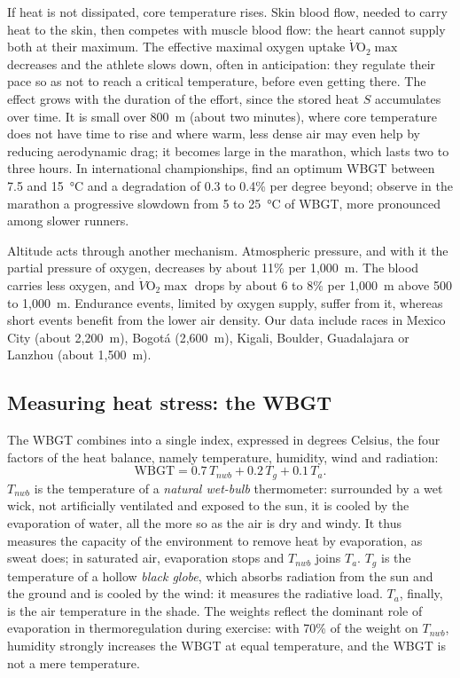 \documentclass[11pt,a4paper]{article}
\newcommand{\WBGT}{\mathrm{WBGT}}
\begin{document}
If heat is not dissipated, core temperature rises. Skin blood flow, needed to carry heat to the skin, then competes
with muscle blood flow: the heart cannot supply both at their maximum. The effective maximal oxygen uptake
$\dot V\mathrm{O}_2\max$ decreases and the athlete slows down, often in anticipation: they regulate their pace so as
not to reach a critical temperature, before even getting there. The effect grows with the duration of the effort,
since the stored heat $S$ accumulates over time. It is small over 800~m (about two minutes), where core temperature
does not have time to rise and where warm, less dense air may even help by reducing aerodynamic drag; it becomes
large in the marathon, which lasts two to three hours. In international championships, \citet{mantzios2022} find an
optimum WBGT between 7.5 and 15~°C and a degradation of 0.3 to 0.4\% per degree beyond; \citet{ely2007} observe in
the marathon a progressive slowdown from 5 to 25~°C of WBGT, more pronounced among slower runners.

Altitude acts through another mechanism. Atmospheric pressure, and with it the partial pressure of oxygen, decreases
by about 11\% per 1,000~m. The blood carries less oxygen, and $\dot V\mathrm{O}_2\max$ drops by about 6 to 8\% per
1,000~m above 500 to 1,000~m. Endurance events, limited by oxygen supply, suffer from it, whereas short events benefit
from the lower air density. Our data include races in Mexico City (about 2,200~m), Bogotá (2,600~m), Kigali, Boulder,
Guadalajara or Lanzhou (about 1,500~m).

\subsection{Measuring heat stress: the WBGT}\label{sec:wbgt}

The WBGT combines into a single index, expressed in degrees Celsius, the four factors of the heat balance, namely
temperature, humidity, wind and radiation:
\begin{equation}\label{eq:wbgt}
\WBGT = 0.7\,T_{nwb} + 0.2\,T_{g} + 0.1\,T_{a}.
\end{equation}
$T_{nwb}$ is the temperature of a \emph{natural wet-bulb} thermometer: surrounded by a wet wick, not artificially
ventilated and exposed to the sun, it is cooled by the evaporation of water, all the more so as the air is dry and
windy. It thus measures the capacity of the environment to remove heat by evaporation, as sweat does; in saturated
air, evaporation stops and $T_{nwb}$ joins $T_a$. $T_{g}$ is the temperature of a hollow \emph{black globe}, which
absorbs radiation from the sun and the ground and is cooled by the wind: it measures the radiative load. $T_{a}$,
finally, is the air temperature in the shade. The weights reflect the dominant role of evaporation in
thermoregulation during exercise: with 70\% of the weight on $T_{nwb}$, humidity strongly increases the WBGT at equal
temperature, and the WBGT is not a mere temperature.
\end{document}
